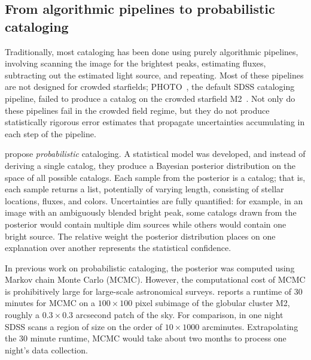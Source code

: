 \subsection{From algorithmic pipelines to probabilistic cataloging}

Traditionally, most cataloging has been done using purely algorithmic pipelines, involving scanning the image for the brightest peaks, estimating fluxes, subtracting out the estimated light source, and repeating. Most of these pipelines are not designed for crowded starfields; PHOTO~\cite{lupton2001sdss}, 
the default SDSS cataloging pipeline, failed to 
produce a catalog on 
the crowded starfield M2~\cite{Portillo_2017}. 
Not only do these pipelines fail in the crowded field
regime, but they do not produce statistically rigorous error estimates that propagate 
uncertainties accumulating in each step of the pipeline. 

\cite{Brewer_2013, Portillo_2017, Feder_2019}
propose {\itshape probabilistic} cataloging.
A statistical model was developed, and instead of deriving a single catalog, they produce a Bayesian posterior distribution on the space of all possible catalogs. 
Each sample from the posterior is a catalog; that is, each sample returns a list, potentially of varying length, consisting of stellar locations, fluxes, and colors. Uncertainties are fully quantified: for example, in an image with an ambiguously blended bright peak, some catalogs drawn from the posterior would contain multiple dim sources while others would contain one bright source. The relative weight the posterior distribution places on one explanation over another represents the statistical confidence. 

In previous work on probabilistic cataloging, the posterior was computed using
Markov chain Monte Carlo (MCMC).
However, the computational cost of MCMC is prohibitively large for
large-scale astronomical surveys. \cite{Feder_2019}
reports a runtime of 30 minutes for MCMC on a $100\times 100$ pixel subimage of the globular cluster M2, roughly a $0.3\times0.3$ arcsecond patch of the sky.
For comparison, in one night SDSS scans a region of size on the order of $10 \times 1000$ arcminutes. Extrapolating the 30 minute runtime, MCMC would take about two months to process one night's data collection. 

